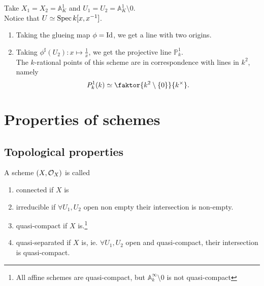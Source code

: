 \documentclass[../main.tex]{subfiles}
\begin{document}
\begin{exemple}
Take $X_1= X_2 = \mathbb{A}_K^{1}$ and $U_1= U_2 = \mathbb{A}^{1}_K \setminus 0$.\\
Notice that $U \simeq \operatorname{Spec} k[x,x^{-1}]$.
\begin{enumerate}
\item Taking the glueing map $\phi= \operatorname{Id}$, we get a line with two origins.
\item Taking $\phi^{\sharp}( U_2) : x \mapsto \frac{1}{x}$, we get the projective line $ \mathbb{P}^{1}_k $.\\
	The $k$-rational points of this scheme are in correspondence with lines in $k^{2}$, namely
	\[ 
	P_k^{1}( k) \simeq \faktor{k^{2}\setminus \left\{ 0 \right\} }{k^{\times}}.
	\]
\end{enumerate}
\end{exemple}
\section{Properties of schemes}
\subsection{Topological properties}
\begin{defn}
	A scheme $( X,\mathcal{O}_X) $ is called 
	\begin{enumerate}
	\item connected if $X$ is
	\item irreducible if $\forall U_1,U_2$ open non empty their intersection is non-empty.
	\item quasi-compact if $X$ is.\footnote{All affine schemes are quasi-compact, but $ \mathbb{A}^{ \infty }_k\setminus 0$ is not quasi-compact}
	\item quasi-separated if $X$ is, ie. $\forall U_1,U_2$ open and quasi-compact, their intersection is quasi-compact.
	\end{enumerate}
\end{defn}
\end{document}
